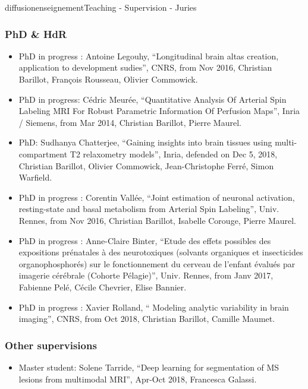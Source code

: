 \documentclass{ra2018}
\begin{document}
\begin{module}{diffusion}{enseignement}{Teaching - Supervision - Juries}
 \subsubsection{PhD \& HdR}
 \begin{itemize}
           \item PhD in progress : Antoine Legouhy, ``Longitudinal brain altas creation, application to development sudies'', CNRS, from Nov 2016, Christian Barillot, François Rousseau, Olivier Commowick.
           \item PhD in progress: Cédric Meurée, ``Quantitative Analysis Of Arterial Spin Labeling MRI For Robust Parametric Information Of Perfusion Maps'', Inria / Siemens, from Mar 2014, Christian Barillot, Pierre Maurel.
	   \item PhD: Sudhanya Chatterjee, ``Gaining insights into brain tissues using multi-compartment T2 relaxometry models'', Inria, defended on Dec 5, 2018, Christian Barillot, Olivier Commowick, Jean-Christophe Ferré, Simon Warfield.
           \item PhD in progress : Corentin Vallée, ``Joint estimation of neuronal activation, resting-state and basal metabolism from Arterial Spin Labeling'', Univ. Rennes, from Nov 2016, Christian Barillot, Isabelle Corouge, Pierre Maurel.
           \item PhD in progress : Anne-Claire Binter, ``Etude des effets possibles des expositions prénatales à des neurotoxiques (solvants organiques et insecticides organophosphorés) sur le fonctionnement du cerveau de l’enfant évalués par imagerie cérébrale (Cohorte Pélagie)'', Univ. Rennes, from Janv 2017, Fabienne Pelé, Cécile Chevrier, Elise Bannier.
           \item PhD in progress : Xavier Rolland, `` Modeling analytic variability in brain imaging'', CNRS, from Oct 2018, Christian Barillot, Camille Maumet.
  \end{itemize}

  \subsubsection{Other supervisions}
  \begin{itemize}
           \item Master student: Solene Tarride, ``Deep learning for segmentation of MS lesions from multimodal MRI'', Apr-Oct 2018, Francesca Galassi.
  \end{itemize}


\end{module}
\end{document}

